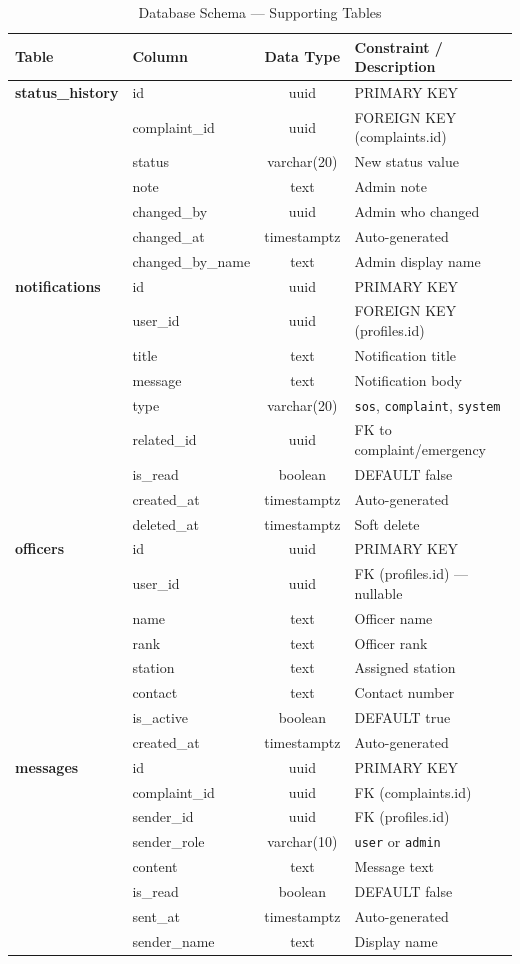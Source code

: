 \documentclass[11pt, a4paper]{report}
\begin{document}
\begin{table}[ht]
\centering
\caption{Database Schema --- Supporting Tables}
\label{tab:supporting}
\begin{tabularx}{\textwidth}{llcX}
\toprule
\textbf{Table} & \textbf{Column} & \textbf{Data Type} & \textbf{Constraint / Description} \\
\midrule
\textbf{status\_history} & id & uuid & PRIMARY KEY \\
& complaint\_id & uuid & FOREIGN KEY (complaints.id) \\
& status & varchar(20) & New status value \\
& note & text & Admin note \\
& changed\_by & uuid & Admin who changed \\
& changed\_at & timestamptz & Auto-generated \\
& changed\_by\_name & text & Admin display name \\
\addlinespace
\textbf{notifications} & id & uuid & PRIMARY KEY \\
& user\_id & uuid & FOREIGN KEY (profiles.id) \\
& title & text & Notification title \\
& message & text & Notification body \\
& type & varchar(20) & \texttt{sos}, \texttt{complaint}, \texttt{system} \\
& related\_id & uuid & FK to complaint/emergency \\
& is\_read & boolean & DEFAULT false \\
& created\_at & timestamptz & Auto-generated \\
& deleted\_at & timestamptz & Soft delete \\
\addlinespace
\textbf{officers} & id & uuid & PRIMARY KEY \\
& user\_id & uuid & FK (profiles.id) --- nullable \\
& name & text & Officer name \\
& rank & text & Officer rank \\
& station & text & Assigned station \\
& contact & text & Contact number \\
& is\_active & boolean & DEFAULT true \\
& created\_at & timestamptz & Auto-generated \\
\addlinespace
\textbf{messages} & id & uuid & PRIMARY KEY \\
& complaint\_id & uuid & FK (complaints.id) \\
& sender\_id & uuid & FK (profiles.id) \\
& sender\_role & varchar(10) & \texttt{user} or \texttt{admin} \\
& content & text & Message text \\
& is\_read & boolean & DEFAULT false \\
& sent\_at & timestamptz & Auto-generated \\
& sender\_name & text & Display name \\
\bottomrule
\end{tabularx}
\end{table}
\end{document}
